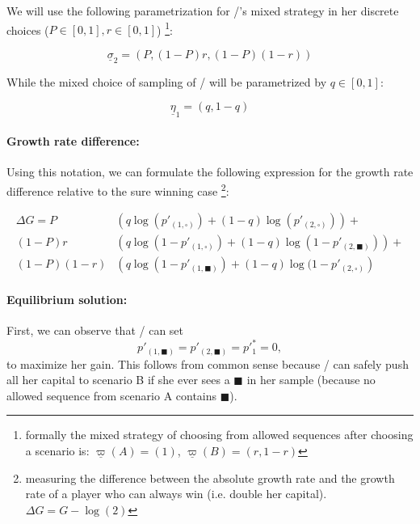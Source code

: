 \documentclass{article}
\newcommand{\wb}{\square}
\newcommand{\bb}{\blacksquare}
\theoremstyle{definition}
\begin{document}
We will use the following parametrization for \PII/'s mixed strategy in her discrete choices ($P \in [0,1], r \in [0,1]$) \footnote{formally the mixed strategy of choosing from allowed sequences after choosing a scenario is: $\underline{\varpi}(A) = (1)$, $\underline{\varpi}(B) = (r,1-r)$}:

\begin{equation}
    \underline{\sigma}_2 = (P, (1-P) r, (1-P)(1-r))
\end{equation}

While the mixed choice of sampling of \PI/ will be parametrized by $q \in [0,1]$:

\begin{equation}
    \underline{\eta}_1 = (q,1-q)
\end{equation}

\paragraph{Growth rate difference:}

Using this notation, we can formulate the following expression for the growth rate difference relative to the sure winning case \footnote{measuring the difference between the absolute growth rate and the growth rate of a player who can always win (i.e. double her capital). $\Delta G = G - \log(2)$}:

\begin{equation}
\label{eq:Simplest_DeltaG}
    \begin{split}
        \Delta G = P & \left ( 
        q \log(p'_{(1,\wb)}) + (1-q) \log(p'_{(2,\wb)})
        \right ) + \\
        (1-P) r & \left (
        q \log(1-p'_{(1,\wb)}) + (1-q) \log(1-p'_{(2,\bb)})
        \right) + \\
        (1-P) (1-r) & \left (
        q \log(1-p'_{(1,\bb)}) + (1-q) \log(1-p'_{(2,\wb)}
        \right )
    \end{split}
\end{equation}

\paragraph{Equilibrium solution:}

First, we can observe that \PI/ can set
\begin{equation}
    p'_{(1,\bb)} = p'_{(2,\bb)} = p'^*_1 = 0,
\end{equation}
to maximize her gain. This follows from common sense because \PI/ can safely push all her capital to scenario B if she ever sees a $\bb$ in her sample (because no allowed sequence from scenario A contains $\bb$).
\end{document}
